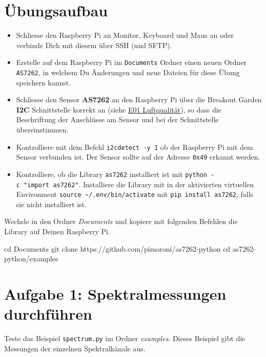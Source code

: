 \documentclass[
  11pt,
  a4paperpaper,
  oneside, openany  ,captions=tableheading
]{scrbook}
\newenvironment{Shaded}{\begin{snugshade}}{\end{snugshade}}
\newcommand{\BuiltInTok}[1]{\textcolor[rgb]{0.00,0.23,0.31}{#1}}
\newcommand{\FunctionTok}[1]{\textcolor[rgb]{0.28,0.35,0.67}{#1}}
\newcommand{\NormalTok}[1]{\textcolor[rgb]{0.00,0.23,0.31}{#1}}
\providecommand{\tightlist}{%
  \setlength{\itemsep}{0pt}\setlength{\parskip}{0pt}}
\theoremstyle{definition}
\theoremstyle{remark}
\begin{document}
\section{Übungsaufbau}\label{uxfcbungsaufbau-1}

\begin{itemize}
\tightlist
\item
  Schliesse den Raspberry Pi an Monitor, Keyboard und Maus an oder
  verbinde Dich mit diesem über SSH (und SFTP).
\item
  Erstelle auf dem Raspberry Pi im \texttt{Documents} Ordner einen neuen
  Ordner \texttt{AS7262}, in welchem Du Änderungen und neue Dateien für
  diese Übung speichern kannst.
\item
  Schliesse den Sensor \textbf{AS7262} an den Raspberry Pi über die
  Breakout Garden \textbf{I2C} Schnittstelle korrekt an (siehe
  \href{E01_Luftqualitaet.qmd}{E01 Luftqualität}), so dass die
  Beschriftung der Anschlüsse am Sensor und bei der Schnittstelle
  übereinstimmen.
\item
  Kontrolliere mit dem Befehl \texttt{i2cdetect\ -y\ 1} ob der Raspberry
  Pi mit dem Sensor verbunden ist. Der Sensor sollte auf der Adresse
  \texttt{0x49} erkannt werden.
\item
  Kontrolliere, ob die Library \texttt{as7262} installiert ist mit
  \texttt{python\ -c\ "import\ as7262"}. Installiere die Library mit in
  der aktivierten virtuellen Environment
  \texttt{source\ \textasciitilde{}/.env/bin/activate} mit
  \texttt{pip\ install\ as7262}, falls sie nicht installiert ist.
\end{itemize}

Wechsle in den Ordner \emph{Documents} und kopiere mit folgenden
Befehlen die Library auf Deinen Raspberry Pi.

\begin{Shaded}
\begin{Highlighting}[]
\BuiltInTok{cd}\NormalTok{ Documents}
\FunctionTok{git}\NormalTok{ clone https://github.com/pimoroni/as7262{-}python}
\BuiltInTok{cd}\NormalTok{ as7262{-}python/examples}
\end{Highlighting}
\end{Shaded}

\section{Aufgabe 1: Spektralmessungen
durchführen}\label{aufgabe-1-spektralmessungen-durchfuxfchren}

Teste das Beispiel \texttt{spectrum.py} im Ordner \emph{examples}.
Dieses Beispiel gibt die Messungen der einzelnen Spektralkänale aus.
\end{document}
